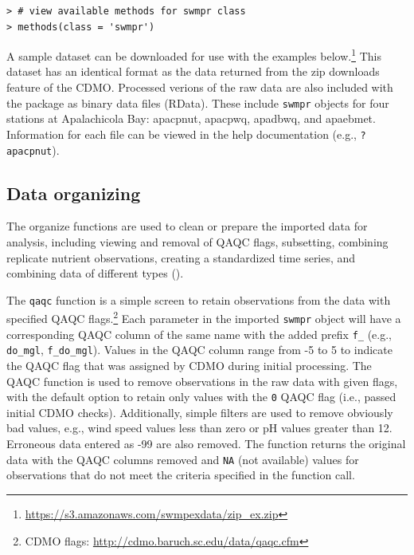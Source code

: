 \documentclass[10pt,letterpaper]{article}\usepackage[]{graphicx}\usepackage[]{color}
\makeatletter
\newenvironment{kframe}{%
 \def\at@end@of@kframe{}%
 \ifinner\ifhmode%
  \def\at@end@of@kframe{\end{minipage}}%
  \begin{minipage}{\columnwidth}%
 \fi\fi%
 \def\FrameCommand##1{\hskip\@totalleftmargin \hskip-\fboxsep
 \colorbox{shadecolor}{##1}\hskip-\fboxsep
     \hskip-\linewidth \hskip-\@totalleftmargin \hskip\columnwidth}%
 \MakeFramed {\advance\hsize-\width
   \@totalleftmargin\z@ \linewidth\hsize
   \@setminipage}}%
 {\par\unskip\endMakeFramed%
 \at@end@of@kframe}
\newenvironment{knitrout}{}{} %
\makeatother
\begin{document}
\begin{knitrout}\small
{}\color{fgcolor}\begin{kframe}
\begin{verbatim}
> # view available methods for swmpr class
> methods(class = 'swmpr')
\end{verbatim}
\end{kframe}
\end{knitrout}

A sample dataset can be downloaded for use with the examples below.\footnote{\url{https://s3.amazonaws.com/swmpexdata/zip_ex.zip}}  This dataset has an identical format as the data returned from the zip downloads feature of the \ac{CDMO}.  Processed verions of the raw data are also included with the package as binary data files (RData).  These include \texttt{swmpr} objects for four stations at Apalachicola Bay: apacpnut, apacpwq, apadbwq, and apaebmet.  Information for each file can be viewed in the help documentation (e.g., \texttt{?apacpnut}).

\subsection*{Data organizing}

The organize functions are used to clean or prepare the imported data for analysis, including viewing and removal of QAQC flags, subsetting, combining replicate nutrient observations, creating a standardized time series, and combining data of different types ().

The \texttt{qaqc} function is a simple screen to retain observations from the data with specified QAQC flags.\footnote{\ac{CDMO} flags: \url{http://cdmo.baruch.sc.edu/data/qaqc.cfm}} Each parameter in the imported \texttt{swmpr} object will have a corresponding QAQC column of the same name with the added prefix \texttt{f\_} (e.g., \texttt{do\_mgl}, \texttt{f\_do\_mgl}).  Values in the QAQC column range from -5 to 5 to indicate the \ac{QAQC} flag that was assigned by \ac{CDMO} during initial processing.  The \ac{QAQC} function is used to remove observations in the raw data with given flags, with the default option to retain only values with the \texttt{0} \ac{QAQC} flag (i.e., passed initial \ac{CDMO} checks).     Additionally, simple filters are used to remove obviously bad values, e.g., wind speed values less than zero or pH values greater than 12. Erroneous data entered as -99 are also removed. The function returns the original data with the QAQC columns removed and \texttt{NA} (not available) values for observations that do not meet the criteria specified in the function call.
\end{document}
